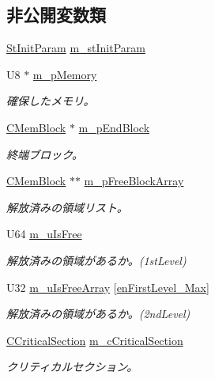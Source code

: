 \subsection*{非公開変数類}
\begin{DoxyCompactItemize}
\item 
\hyperlink{struct_c_mem_allocator_1_1_st_init_param}{St\+Init\+Param} \hyperlink{class_c_mem_allocator_a5ae9573631f11b58cb0741dd5d071d4e}{m\+\_\+st\+Init\+Param}
\item 
U8 $\ast$ \hyperlink{class_c_mem_allocator_ad729846ce9ff5ecdac69574604140e39}{m\+\_\+p\+Memory}
\begin{DoxyCompactList}\small\item\em 確保したメモリ。 \end{DoxyCompactList}\item 
\hyperlink{class_c_mem_block}{C\+Mem\+Block} $\ast$ \hyperlink{class_c_mem_allocator_aac2d7de345dbb577fa47907647bb831f}{m\+\_\+p\+End\+Block}
\begin{DoxyCompactList}\small\item\em 終端ブロック。 \end{DoxyCompactList}\item 
\hyperlink{class_c_mem_block}{C\+Mem\+Block} $\ast$$\ast$ \hyperlink{class_c_mem_allocator_a5593b5d4263ee5e0af22458ad8f89f21}{m\+\_\+p\+Free\+Block\+Array}
\begin{DoxyCompactList}\small\item\em 解放済みの領域リスト。 \end{DoxyCompactList}\item 
U64 \hyperlink{class_c_mem_allocator_a9f35f48a378b79fc033b6aa6dcf13b73}{m\+\_\+u\+Is\+Free}
\begin{DoxyCompactList}\small\item\em 解放済みの領域があるか。(1st\+Level) \end{DoxyCompactList}\item 
U32 \hyperlink{class_c_mem_allocator_a6fc0c334bf8f88d108b7f7ca1b87c682}{m\+\_\+u\+Is\+Free\+Array} \mbox{[}\hyperlink{class_c_mem_allocator_a780a1a1225569ea2d2a8b7db9f9c7089ab914654c48cd4a1779f988840ea2a151}{en\+First\+Level\+\_\+\+Max}\mbox{]}
\begin{DoxyCompactList}\small\item\em 解放済みの領域があるか。(2nd\+Level) \end{DoxyCompactList}\item 
\hyperlink{class_c_critical_section}{C\+Critical\+Section} \hyperlink{class_c_mem_allocator_ac777d3d046eab9d58e8749a68a6bf36c}{m\+\_\+c\+Critical\+Section}
\begin{DoxyCompactList}\small\item\em クリティカルセクション。 \end{DoxyCompactList}\end{DoxyCompactItemize}


